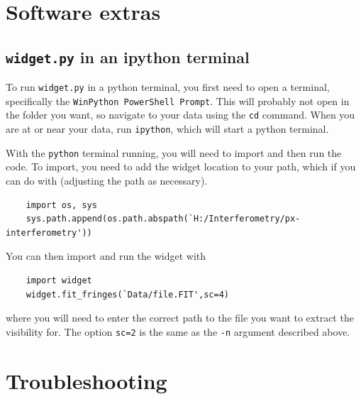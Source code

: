 \documentclass[11pt]{article}
\begin{document}
\clearpage

\section{Software extras}

\subsection{\texttt{widget.py} in an ipython terminal}\label{sec:widget_ipython}

To run \texttt{widget.py} in a python terminal, you first need to open a terminal, specifically the \texttt{WinPython PowerShell Prompt}. This will probably not open in the folder you want, so navigate to your data using the \texttt{cd} command. When you are at or near your data, run \texttt{ipython}, which will start a python terminal.

With the \texttt{python} terminal running, you will need to import and then run the code. To import, you need to add the widget location to your path, which if you can do with (adjusting the path as necessary).
\begin{verbatim}
    import os, sys
    sys.path.append(os.path.abspath(`H:/Interferometry/px-interferometry'))
\end{verbatim}
You can then import and run the widget with
\begin{verbatim}
    import widget
    widget.fit_fringes(`Data/file.FIT',sc=4)
\end{verbatim}
where you will need to enter the correct path to the file you want to extract the visibility for. The option \texttt{sc=2} is the same as the \texttt{-n} argument described above.



\clearpage

\section{Troubleshooting}
\end{document}
